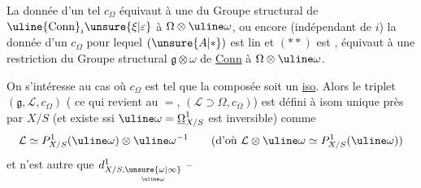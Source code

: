 La donnée d'un tel  $c_\Omega$ équivaut à une
 du Groupe structural de
$\uline{\mathrm{Conn}}_i\unsure{\xi|\varepsilon}$ à $\Omega\otimes\uline\omega$, ou encore
(indépendant de $i$) la donnée d'un $c_\Omega$ pour lequel
$(\unsure{A|*})$ est lin et $(**)$ est , équivaut
à une restriction du Groupe structural
$\mathfrak g\otimes\omega$ de \uline{Conn} à $\Omega\otimes\uline\omega$.

On s'intéresse au cas où  $c_\Omega$ est
tel que la composée
soit un \uline{iso}. Alors le triplet
$(\mathfrak g,\mathcal L,c_\Omega)$
( ce qui revient au
$=$, $(\mathcal L\supset\Omega,c_\Omega)$) est défini à isom
unique près par $X/S$ (et existe ssi
$\uline\omega=\underline\Omega^1_{X/S}$ est inversible) comme
\[
\mathcal L\simeq P^1_{X/S}(\uline\omega)\otimes\uline\omega^{-1}
\qquad(\text{d'où }\mathcal L\otimes\uline\omega\simeq P^1_{X/S}(\uline\omega))
\]
et
n'est autre que
$d^1_{X/S,\underset{\uline\omega}{\unsure{\omega|\infty}}}$ --


